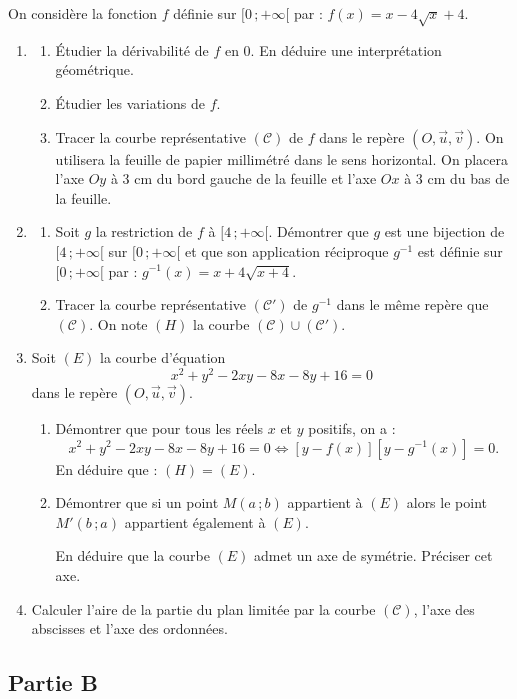On considère la fonction $f$ définie sur $[0\,;+\infty[$ par : $f(x)=x-4\sqrt{x}+4$.

\begin{enumerate}
	\item
	\begin{enumerate}
		\item Étudier la dérivabilité de $f$ en $0$. En déduire une interprétation géométrique.
		\item Étudier les variations de $f$.
		\item Tracer la courbe représentative $(\mathscr{C})$ de $f$ dans le repère $(O,\vec{u},\vec{v})$. On utilisera la feuille de papier millimétré dans le sens horizontal. On placera l'axe $Oy$ à $3$ cm du bord gauche de la feuille et l'axe $Ox$ à $3$ cm du bas de la feuille.
	\end{enumerate}
	\item
	\begin{enumerate}
		\item Soit $g$ la restriction de $f$ à $[4\,;+\infty[$. Démontrer que $g$ est une bijection de $[4\,;+\infty[$ sur $[0\,;+\infty[$ et que son application réciproque $g^{-1}$ est définie sur $[0\,;+\infty[$ par : $g^{-1}(x)=x+4\sqrt{x+4}$.
		\item Tracer la courbe représentative $(\mathscr{C}')$ de $g^{-1}$ dans le même repère que $(\mathscr{C})$. On note $(H)$ la courbe $(\mathscr{C})\cup(\mathscr{C}')$.
	\end{enumerate}
	\item Soit $(E)$ la courbe d'équation
	\[
	x^2+y^2-2xy-8x-8y+16=0
	\]
	dans le repère $(O,\vec{u},\vec{v})$.
	\begin{enumerate}
		\item Démontrer que pour tous les réels $x$ et $y$ positifs, on a :
		\[
		x^2+y^2-2xy-8x-8y+16=0 \iff [y-f(x)][y-g^{-1}(x)]=0.
		\]
		En déduire que : $(H)=(E)$.
		\item Démontrer que si un point $M(a\,;b)$ appartient à $(E)$ alors le point $M'(b\,;a)$ appartient également à $(E)$.

		En déduire que la courbe $(E)$ admet un axe de symétrie. Préciser cet axe.
	\end{enumerate}
	\item Calculer l'aire de la partie du plan limitée par la courbe $(\mathscr{C})$, l'axe des abscisses et l'axe des ordonnées.
\end{enumerate}

\subsection*{Partie B}

